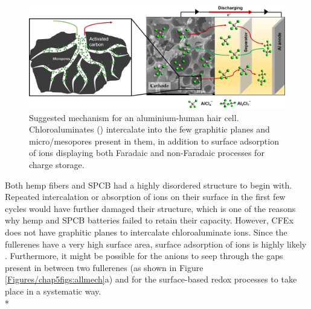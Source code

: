  \begin{figure}[h!]
  \centering
  \includegraphics[width=\textwidth]{Figures/chap5fig/achmech}
    \caption{Suggested mechanism for an aluminium-human hair cell. Chloroaluminates () intercalate into the few graphitic planes and micro/mesopores present in them, in addition to surface adsorption of ions displaying both Faradaic and non-Faradaic processes for charge storage.}
  \label{Figures/chap5fig:achmech}
\end{figure}

Both hemp fibers and SPCB had a highly disordered structure to begin with. Repeated intercalation or absorption of ions on their surface in the first few cycles would have further damaged their structure, which is one of the reasons why hemp and SPCB batteries failed to retain their capacity. However, CFEx does not have graphitic planes to intercalate chloroaluminate ions. Since the fullerenes have a very high surface area, surface adsorption of ions is highly likely \cite{adams_van_1994}. Furthermore, it might be possible for the anions to seep through the gaps present in between two fullerenes (as shown in Figure \ref{Figures/chap5figs:allmech}a) and for the surface-based redox processes to take place in a systematic way.\\*

